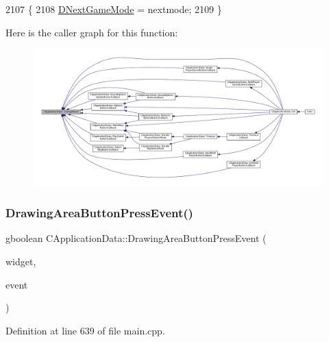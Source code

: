 \begin{DoxyCode}
2107                                                    \{
2108     \hyperlink{classCApplicationData_a3b67edeacd70201dcf96fa9fa8aa2107}{DNextGameMode} = nextmode;
2109 \}
\end{DoxyCode}
Here is the caller graph for this function\+:
\nopagebreak
\begin{figure}[H]
\begin{center}
\leavevmode
\includegraphics[width=350pt]{classCApplicationData_aee18c113e9a0acb3cad3d63eb19de71b_icgraph}
\end{center}
\end{figure}
\hypertarget{classCApplicationData_ae7516e29f629998e4068ae1584d0237c}{}\label{classCApplicationData_ae7516e29f629998e4068ae1584d0237c} 
\subsubsection{\texorpdfstring{Drawing\+Area\+Button\+Press\+Event()}{DrawingAreaButtonPressEvent()}}
{\footnotesize\ttfamily gboolean C\+Application\+Data\+::\+Drawing\+Area\+Button\+Press\+Event (\begin{DoxyParamCaption}\item[{Gtk\+Widget $\ast$}]{widget,  }\item[{Gdk\+Event\+Button $\ast$}]{event }\end{DoxyParamCaption})\hspace{0.3cm}{\ttfamily [protected]}}



Definition at line 639 of file main.\+cpp.


